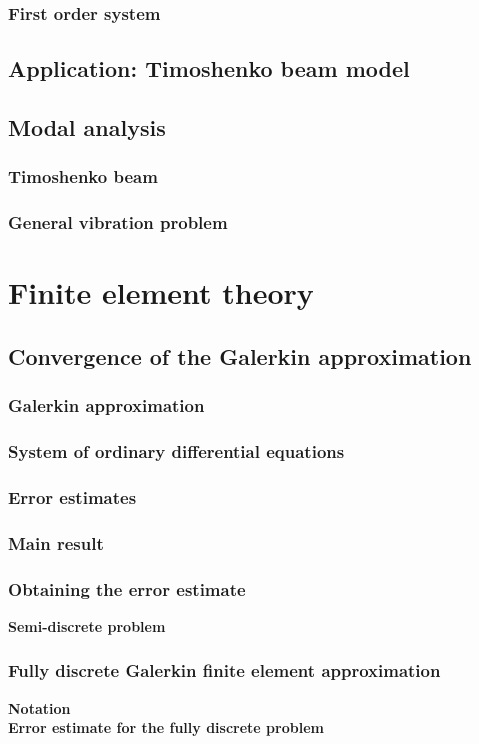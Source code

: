\documentclass[../main.tex]{subfiles}
\begin{document}
\subsubsection{First order system}
\subsection{Application: Timoshenko beam model}
\subsection{Modal analysis}
\subsubsection{Timoshenko beam}
\subsubsection{General vibration problem}
\section{Finite element theory}
\subsection{Convergence of the Galerkin approximation}
\subsubsection{Galerkin approximation}
\subsubsection{System of ordinary differential equations}
\subsubsection{Error estimates}
\subsubsection{Main result}
\subsubsection{Obtaining the error estimate}
\textbf{Semi-discrete problem}
\subsubsection{Fully discrete Galerkin finite element approximation}
\textbf{Notation}\\
\textbf{Error estimate for the fully discrete problem}
\end{document}
